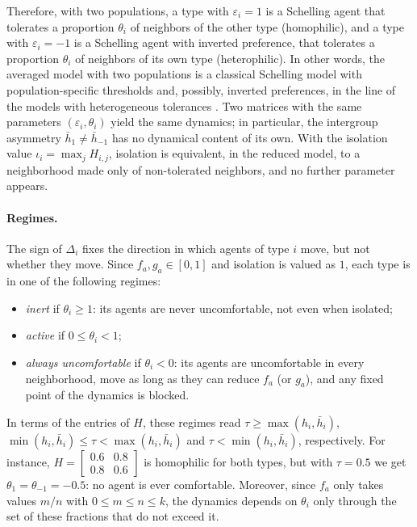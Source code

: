 \documentclass{article}
\theoremstyle{remark}
\begin{document}
Therefore, with two populations, a type with $\varepsilon_i=1$ is a Schelling agent that tolerates a proportion $\theta_i$ of neighbors of the other type (homophilic), and a type with $\varepsilon_i=-1$ is a Schelling agent with inverted preference, that tolerates a proportion $\theta_i$ of neighbors of its own type (heterophilic). In other words, the averaged model with two populations is a classical Schelling model with population-specific thresholds and, possibly, inverted preferences, in the line of the models with heterogeneous tolerances \cite{clark2008understanding,hatna2012schelling}. Two matrices with the same parameters $(\varepsilon_i,\theta_i)$ yield the same dynamics; in particular, the intergroup asymmetry $\bar h_1\neq\bar h_{-1}$ has no dynamical content of its own. With the isolation value $\iota_i=\max_j H_{i,j}$, isolation is equivalent, in the reduced model, to a neighborhood made only of non-tolerated neighbors, and no further parameter appears.

\paragraph{Regimes.} The sign of $\Delta_i$ fixes the direction in which agents of type $i$ move, but not whether they move. Since $f_a,g_a\in[0,1]$ and isolation is valued as $1$, each type is in one of the following regimes:
\begin{itemize}
    \item \emph{inert} if $\theta_i\ge 1$: its agents are never uncomfortable, not even when isolated;
    \item \emph{active} if $0\le\theta_i<1$;
    \item \emph{always uncomfortable} if $\theta_i<0$: its agents are uncomfortable in every neighborhood, move as long as they can reduce $f_a$ (or $g_a$), and any fixed point of the dynamics is blocked.
\end{itemize}
In terms of the entries of $H$, these regimes read $\tau\ge\max(h_i,\bar h_i)$, $\min(h_i,\bar h_i)\le\tau<\max(h_i,\bar h_i)$ and $\tau<\min(h_i,\bar h_i)$, respectively. For instance, $H=\begin{bmatrix}0.6&0.8\\0.8&0.6\end{bmatrix}$ is homophilic for both types, but with $\tau=0.5$ we get $\theta_1=\theta_{-1}=-0.5$: no agent is ever comfortable. Moreover, since $f_a$ only takes values $m/n$ with $0\le m\le n\le k$, the dynamics depends on $\theta_i$ only through the set of these fractions that do not exceed it.
\end{document}
